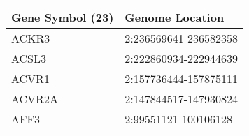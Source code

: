 \begin{tabular}{ll}
\toprule
Gene Symbol (23) &       Genome Location \\
\midrule
           ACKR3 & 2:236569641-236582358 \\
           ACSL3 & 2:222860934-222944639 \\
           ACVR1 & 2:157736444-157875111 \\
          ACVR2A & 2:147844517-147930824 \\
            AFF3 &  2:99551121-100106128 \\
\bottomrule
\end{tabular}
